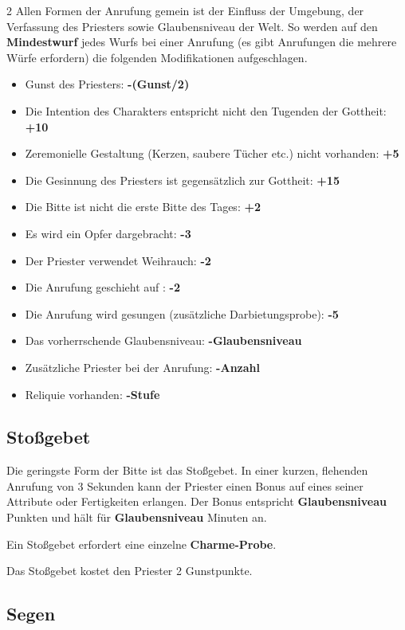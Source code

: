 \begin{multicols}{2}
Allen Formen der Anrufung gemein ist der Einfluss der Umgebung, der Verfassung des Priesters sowie Glaubensniveau der Welt. So werden auf den \textbf{Mindestwurf} jedes Wurfs bei einer Anrufung (es gibt Anrufungen die mehrere Würfe erfordern) die folgenden Modifikationen aufgeschlagen.

\begin{itemize}
    \item Gunst des Priesters: \textbf{-(Gunst/2)}
    \item Die Intention des Charakters entspricht nicht den Tugenden der Gottheit: \textbf{+10}
    \item Zeremonielle Gestaltung (Kerzen, saubere Tücher etc.) nicht vorhanden: \textbf{+5}
    \item Die Gesinnung des Priesters ist gegensätzlich zur Gottheit: \textbf{+15}
    \item Die Bitte ist nicht die erste Bitte des Tages: \textbf{+2}
    \item Es wird ein Opfer dargebracht: \textbf{-3}
    \item Der Priester verwendet Weihrauch: \textbf{-2}
    \item Die Anrufung geschieht auf : \textbf{-2}
    \item Die Anrufung wird gesungen (zusätzliche Darbietungsprobe): \textbf{-5}
    \item Das vorherrschende Glaubensniveau: \textbf{-Glaubensniveau}
    \item Zusätzliche Priester bei der Anrufung: \textbf{-Anzahl}
    \item Reliquie vorhanden: \textbf{-Stufe}
\end{itemize}

\subsection{Stoßgebet}

Die geringste Form der Bitte ist das Stoßgebet. In einer kurzen, flehenden Anrufung von 3 Sekunden kann der Priester einen Bonus auf eines seiner Attribute oder Fertigkeiten erlangen. Der Bonus entspricht \textbf{Glaubensniveau} Punkten und hält für \textbf{Glaubensniveau} Minuten an.

Ein Stoßgebet erfordert eine einzelne \textbf{Charme-Probe}.

Das Stoßgebet kostet den Priester 2 Gunstpunkte.

\subsection{Segen}


\end{multicols}
